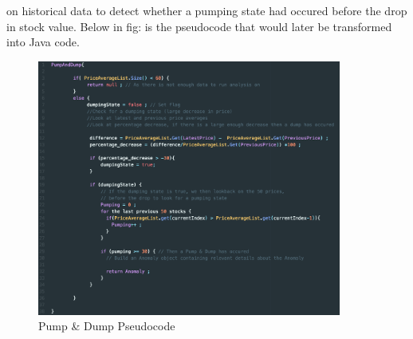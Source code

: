 \documentclass[12pt]{article}
\begin{document}
    on historical data to detect whether a pumping state had occured before the drop in stock value. Below in fig: is the
    pseudocode that would later be transformed into Java code.
    \begin{figure}[H]
    \centering
    \includegraphics[width=100mm]{PDpseudo.png}
    \caption{Pump \& Dump Pseudocode}
    \end{figure}
\end{document}
